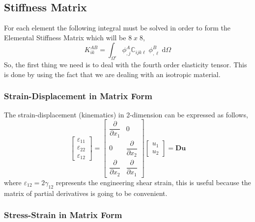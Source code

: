 \documentclass[11pt, a4paper]{article}
\numberwithin{equation}{section}
\begin{document}
\subsection{Stiffness Matrix}

For each element the following integral must be solved in order to form the Elemental Stiffness Matrix which will be $8\; x\; 8$,
\begin{equation}
K_{ik}^{AB} = \int_{\Omega^e} \phi^A_{,j} \mathbb{C}_{ijk\ell} \;\phi^B_{,\ell}\; \mathrm{d} \Omega 
\end{equation}
So, the first thing we need is to deal with the fourth order elasticity tensor. This is done by using the fact that we are dealing with an isotropic material.

\subsubsection{Strain-Displacement in Matrix Form}

The strain-displacement (kinematics) in 2-dimension can be expressed as follows,
\begin{equation}
\begin{bmatrix}
\varepsilon_{11} \\
\varepsilon_{22} \\
\varepsilon_{12}
\end{bmatrix} 
= 
\begin{bmatrix}
\dfrac{\partial}{\partial x_1}  & 0 \\
0 &\dfrac{\partial}{\partial x_2} \\[0.4cm]
\dfrac{\partial}{\partial x_2}  &  \dfrac{\partial}{\partial x_1} 
\end{bmatrix}
\begin{bmatrix}
u_1 \\
u_2
\end{bmatrix}
=\mathbf{Du}
\end{equation}
where $\varepsilon_{12} = 2\gamma_{12} $ represents the engineering shear strain, this is useful because the matrix of partial derivatives is going to be convenient.

\subsubsection{Stress-Strain in Matrix Form}
\end{document}
